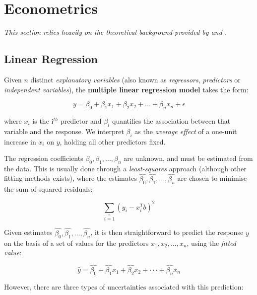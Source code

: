 \section{Econometrics}
\textit{This section relies heavily on the theoretical background provided by \cite{wooldridge} and \cite{introR}.}


\subsection{Linear Regression}
Given $n$ distinct \textit{explanatory variables} (also known as \textit{regressors}, \textit{predictors} or \textit{independent variables}), the \textbf{multiple linear regression model} takes the form:

\begin{equation}
    y = \beta_0 + \beta_1 x_1 + \beta_2 x_2 + ... + \beta_n x_n + \epsilon
\end{equation}

where $x_i$ is the i$^{th}$ predictor and $\beta_i$ quantifies the association between that variable and the response. We interpret $\beta_i$ as the \textit{average effect} of a one-unit increase in $x_i$ on $y$, holding all other predictors fixed.

The regression coefficients $\beta_0, \beta_1, ..., \beta_n$ are unknown, and must be estimated from the data. This is usually done through a \textit{least-squares} approach (although other fitting methods exists), where the estimates $\hat{\beta_0}, \hat{\beta_1}, ..., \hat{\beta_n}$ are chosen to minimise the sum of squared residuals:

\begin{equation}
    \sum\limits_{i=1}\limits^n (y_i - x_i ^T b)^2
\end{equation}

Given estimates $\hat{\beta_0}, \hat{\beta_1}, ..., \hat{\beta_n}$, it is then straightforward to predict the response $y$ on the basis of a set of values for the predictors $x_1, x_2, ..., x_n$, using the \textit{fitted value}:

\begin{equation}
    \hat{y} = \hat{\beta_0} + \hat{\beta_1} x_1 + \hat{\beta_2} x_2 + ··· + \hat{\beta_n} x_n
\end{equation}

However, there are three types of uncertainties associated with this prediction:

